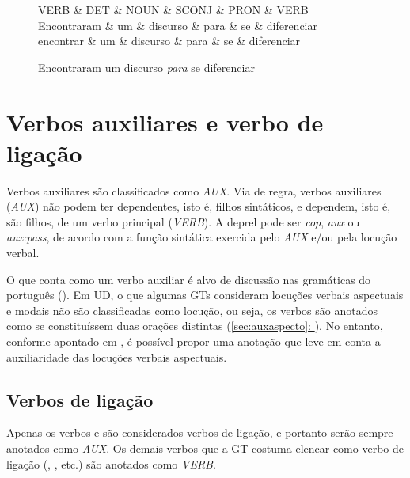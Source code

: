 \documentclass[output=paper,colorlinks,citecolor=brown]{langscibook}
\newcommand*{\fullref}[1]{\hyperref[{#1}]{\autoref*{#1}: \nameref*{#1}}} %
\begin{document}
	\begin{figure}[htbp]
		\centering
		\vspace{.8cm}
		\begin{dependency}
			\begin{deptext}
				VERB \& DET \& NOUN \& SCONJ \& PRON \& VERB \\
				Encontraram \& um \& discurso \& para \& se \& diferenciar \\
				encontrar \& um \& discurso \& para \& se \& diferenciar \\
			\end{deptext}
		\end{dependency}
		\caption{Encontraram um discurso \emph{para} se diferenciar}\label{dep:classesdinamicas}
	\end{figure}


\section{Verbos auxiliares e verbo de ligação}\label{sec:verbosauxiliares}

	Verbos auxiliares são classificados como \emph{AUX}. Via de regra, verbos auxiliares (\emph{AUX}) não podem ter dependentes, isto é, filhos sintáticos, e dependem, isto é, são filhos, de um verbo principal (\emph{VERB}). A deprel pode ser \emph{cop}, \emph{aux} ou \emph{aux:pass}, de acordo com a função sintática exercida pelo \emph{AUX} e/ou pela locução verbal.

	O que conta como um verbo auxiliar é alvo de discussão nas gramáticas do português (\citet{elvis2019locverbal}). Em UD, o que algumas GTs consideram locuções verbais aspectuais e modais não são classificadas como locução, ou seja, os verbos são anotados como se constituíssem duas orações distintas (\fullref{sec:auxaspecto}). No entanto, conforme apontado em \citet{elvis2019locverbal}, é possível propor uma anotação que leve em conta a auxiliaridade das locuções verbais aspectuais.

	\subsection{Verbos de ligação}\label{sec:verbosdeligacao}
	
		Apenas os verbos  e  são considerados verbos de ligação, e portanto serão sempre anotados como \textit{AUX}. Os demais verbos que a GT costuma elencar como verbo de ligação (, , etc.) são anotados como \textit{VERB}.
\end{document}
